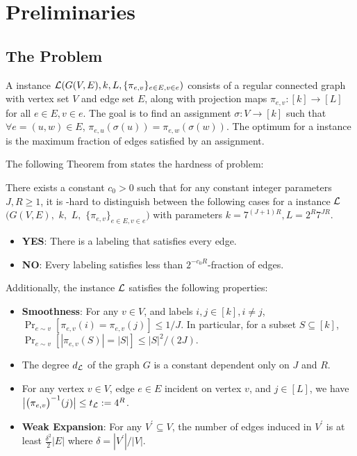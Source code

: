 \section{Preliminaries}\label{sec:prelim}

\subsection{The \LC Problem}			\label{subsec:label_cover}


\begin{definition}\label{sec:ug}
A \LC instance $\mathcal{L}(G(V, E),k,L, \{\pi_{e,v}\}_{e \in E,v \in e})$ consists of a regular connected graph with vertex set $V$ and edge set $E$, along with  projection maps $\pi_{e,v}: [k] \to [L]$ for all $e \in E,v \in e$. 
The goal is to find an assignment $\sigma: V \to [k]$ such that $\forall e = (u, w) \in E$, $\pi_{e,u}(\sigma(u)) = \pi_{e,w}(\sigma(w))$. The optimum for a \LC instance is the maximum fraction of edges satisfied by an assignment.
\end{definition}


The following Theorem from \cite{GRSW} states the hardness of \LC problem:

\begin{theorem}\label{thm-LC-hardness}
There exists a constant $c_0 > 0$ such that for any constant integer
parameters $J,R \ge 1$, it is \NP-hard to distinguish between the
following cases for a \LC instance $\mathcal{L}$$(G(V, E),$ $k,$ $L,$
$\{\pi_{e,v}\}_{e \in E,v \in e})$ with parameters $k = 7^{(J+1)R}, L=2^{R}7^{JR}$.
\begin{itemize}
	\item {\bf YES}: There is a labeling that satisfies every edge.
	\item {\bf NO}: Every labeling satisfies less than $2^{-c_0R}$-fraction of edges.
\end{itemize}
Additionally, the instance $\mathcal{L}$ satisfies the following properties:
\begin{itemize}
	\item {\bf Smoothness}: For any $v \in V$, and labels $i,j \in [k], i \ne j$, $\Pr_{e \sim v}[\pi_{e,v}(i) = \pi_{e,v}(j)] \le 1/J$. In particular, for a subset $S \subseteq [k]$, $\Pr_{e \sim v}\left[\left|\pi_{e,v}(S)\right| = \left|S\right|\right] \leq |S|^2/(2J)$. 
	\item The degree $d_{\mathcal{L}}$ of the graph $G$ is a constant dependent only on $J$ and $R$.
	\item For any vertex $v \in V$, edge $e \in E$ incident on
vertex $v$, and $j \in [L]$, we have
$\big|\big(\pi_{e,v}\big)^{-1}(j)\big| \le t_{\mathcal{L}} := 4^R$.
	\item {\bf Weak Expansion}: For any $V^\prime \subseteq V$, the number of edges induced in $V^\prime$ is at least $\frac{\delta^2}{2}|E|$ where $\delta = |V^\prime|/|V|$.
\end{itemize}
\end{theorem}





